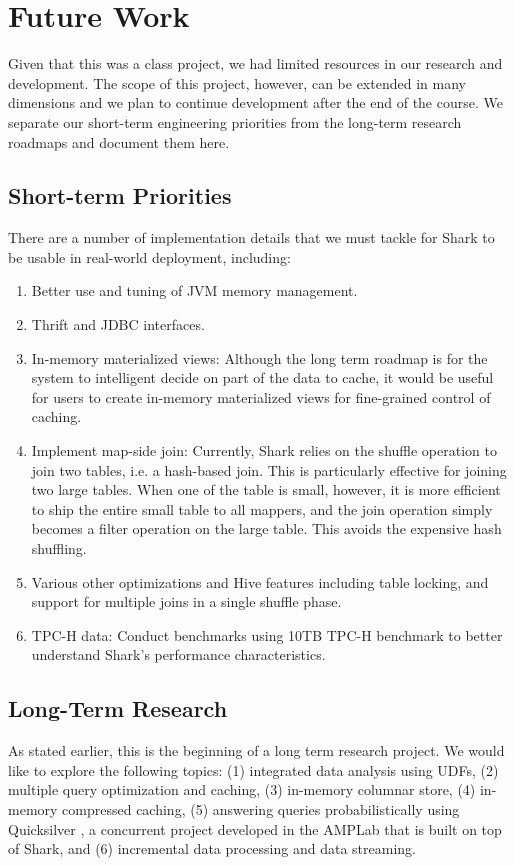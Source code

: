 
\section{Future Work}
\label{sec:future}

Given that this was a class project, we had limited resources in our research and development. The scope of this project, however, can be extended in many dimensions and we plan to continue development after the end of the course. We separate our short-term engineering priorities from the long-term research roadmaps and document them here.

\subsection{Short-term Priorities}
There are a number of implementation details that we must tackle for Shark to be usable in real-world deployment, including:
\begin{enumerate}
    \item Better use and tuning of JVM memory management.
	\item Thrift and JDBC interfaces.
	\item In-memory materialized views: Although the long term roadmap is for the system to intelligent decide on part of the data to cache, it would be useful for users to create in-memory materialized views for fine-grained control of caching.
	\item Implement map-side join: Currently, Shark relies on the shuffle operation to join two tables, i.e. a hash-based join. This is particularly effective for joining two large tables. When one of the table is small, however, it is more efficient to ship the entire small table to all mappers, and the join operation simply becomes a filter operation on the large table. This avoids the expensive hash shuffling.
	\item Various other optimizations and Hive features including table locking, and support for multiple joins in a single shuffle phase.
	\item TPC-H data: Conduct benchmarks using 10TB TPC-H benchmark to better understand Shark's performance characteristics.
\end{enumerate}


\subsection{Long-Term Research}
As stated earlier, this is the beginning of a long term research project. We would like to explore the following topics: (1) integrated data analysis using UDFs, (2) multiple query optimization and caching, (3) in-memory columnar store, (4) in-memory compressed caching, (5) answering queries probabilistically using Quicksilver \cite{quicksilverdb}, a concurrent project developed in the AMPLab that is built on top of Shark, and (6) incremental data processing and data streaming. 

